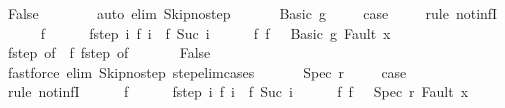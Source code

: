 \begin{isabellebody}
\ False\isanewline
\ \ \ \ \ \ \isamarkupfalse%
\ {\isacharparenleft}auto\ elim{\isacharcolon}\ Skip{\isacharunderscore}no{\isacharunderscore}step{\isacharparenright}\isanewline
\ \ \isamarkupfalse%
\isanewline
{}\isamarkupfalse%
\isanewline
\ \ \isamarkupfalse%
\ {\isacharparenleft}Basic\ g{\isacharparenright}\ \isanewline
\ \ \isamarkupfalse%
\ {\isacharquery}case\ \isanewline
\ \ \isamarkupfalse%
\ {\isacharparenleft}rule\ not{\isacharunderscore}infI{\isacharparenright}\isanewline
\ \ \ \ \isamarkupfalse%
\ f\isanewline
\ \ \ \ \isamarkupfalse%
\ f{\isacharunderscore}step{\isacharcolon}\ {\isachardoublequoteopen}{\isasymAnd}i{\isachardot}\ {\isasymGamma}{\isasymturnstile}f\ i\ {\isasymrightarrow}\ f\ {\isacharparenleft}Suc\ i{\isacharparenright}{\isachardoublequoteclose}\isanewline
\ \ \ \ \isamarkupfalse%
\ f{\isacharunderscore}{}{\isacharcolon}\ {\isachardoublequoteopen}f\ {}\ {\isacharequal}\ {\isacharparenleft}Basic\ g{\isacharcomma}\ Fault\ x{\isacharparenright}{\isachardoublequoteclose}\ \isanewline
\ \ \ \ \isamarkupfalse%
\ f{\isacharunderscore}step\ {\isacharbrackleft}of\ {}{\isacharbrackright}\ f{\isacharunderscore}{}\ f{\isacharunderscore}step\ {\isacharbrackleft}of\ {}{\isacharbrackright}\isanewline
\ \ \ \ \isamarkupfalse%
\ False\isanewline
\ \ \ \ \ \ \isamarkupfalse%
\ {\isacharparenleft}fastforce\ elim{\isacharcolon}\ Skip{\isacharunderscore}no{\isacharunderscore}step\ step{\isacharunderscore}elim{\isacharunderscore}cases{\isacharparenright}\isanewline
\ \ \isamarkupfalse%
\isanewline
{}\isamarkupfalse%
\isanewline
\ \ \isamarkupfalse%
\ {\isacharparenleft}Spec\ r{\isacharparenright}\ \isanewline
\ \ \isamarkupfalse%
\ {\isacharquery}case\ \isanewline
\ \ \isamarkupfalse%
\ {\isacharparenleft}rule\ not{\isacharunderscore}infI{\isacharparenright}\isanewline
\ \ \ \ \isamarkupfalse%
\ f\isanewline
\ \ \ \ \isamarkupfalse%
\ f{\isacharunderscore}step{\isacharcolon}\ {\isachardoublequoteopen}{\isasymAnd}i{\isachardot}\ {\isasymGamma}{\isasymturnstile}f\ i\ {\isasymrightarrow}\ f\ {\isacharparenleft}Suc\ i{\isacharparenright}{\isachardoublequoteclose}\isanewline
\ \ \ \ \isamarkupfalse%
\ f{\isacharunderscore}{}{\isacharcolon}\ {\isachardoublequoteopen}f\ {}\ {\isacharequal}\ {\isacharparenleft}Spec\ r{\isacharcomma}\ Fault\ x{\isacharparenright}{\isachardoublequoteclose}\ \isanewline

\end{isabellebody}
